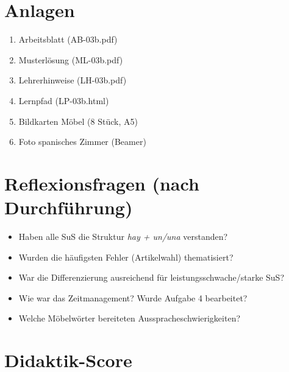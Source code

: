 \documentclass[11pt,a4paper]{article}
\begin{document}
\section{Anlagen}

\begin{enumerate}
    \item Arbeitsblatt (AB-03b.pdf)
    \item Musterlösung (ML-03b.pdf)
    \item Lehrerhinweise (LH-03b.pdf)
    \item Lernpfad (LP-03b.html)
    \item Bildkarten Möbel (8 Stück, A5)
    \item Foto spanisches Zimmer (Beamer)
\end{enumerate}

\section{Reflexionsfragen (nach Durchführung)}

\begin{itemize}
    \item Haben alle SuS die Struktur \textit{hay + un/una} verstanden?
    \item Wurden die häufigsten Fehler (Artikelwahl) thematisiert?
    \item War die Differenzierung ausreichend für leistungsschwache/starke SuS?
    \item Wie war das Zeitmanagement? Wurde Aufgabe 4 bearbeitet?
    \item Welche Möbelwörter bereiteten Ausspracheschwierigkeiten?
\end{itemize}

\newpage
\section{Didaktik-Score}
\end{document}
